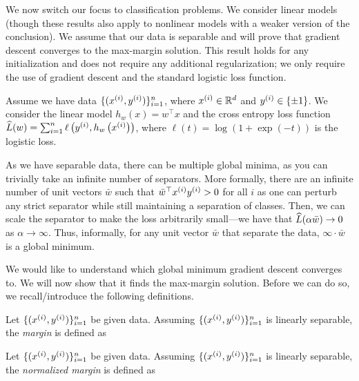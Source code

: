We now switch our focus to classification problems. We consider linear models (though these results also apply to nonlinear models with a weaker version of the conclusion). We assume that our data is separable and will prove that gradient descent converges to the max-margin solution. This result holds for any initialization and does not require any additional regularization; we only require the use of gradient descent and the standard logistic loss function.

Assume we have data $\{(x\sp{i}, y\sp{i}) \}_{i=1}^n $, where $x\sp{i} \in \R^d$ and $y\sp{i} \in \{\pm 1 \}$. We consider the linear model $ h_w(x) = w^\top x$ and the cross entropy loss function $\hatL (w) = \sum_{i=1}^n \ell\left(y\sp{i}, h_w\l (x\sp{i} \r )\right)$, where $ \ell(t) = \log(1 + \exp(-t))$ is the logistic loss.

As we have separable data, there can be multiple global minima, as you can trivially take an infinite number of separators. More formally, there are an infinite number of unit vectors $\bar{w}$ such that $\bar{w}^\top x\sp{i} y\sp{i} > 0$ for all $i$ as one can perturb any strict separator  while still maintaining a separation of classes. Then, we can scale the separator to make the loss arbitrarily small---we have that $ \hatL(\alpha \bar{w}) \to 0$ as $ \alpha \to \infty$. Thus, informally, for any unit vector $\bar{w}$ that separate the data, $\infty \cdot \bar{w}$ is a global minimum. %

We would like to understand which global minimum gradient descent converges to. We will now show that it finds the max-margin solution. Before we can do so, we recall/introduce the following definitions.

\begin{definition}[Margin]
Let $\{(x\sp{i}, y\sp{i}) \}_{i=1}^n $ be given data. Assuming $\{(x\sp{i}, y\sp{i}) \}_{i=1}^n$ is linearly separable, the \textit{margin} is defined as
\end{definition}

\begin{definition}\label{lec16:def:norm_margin}
Let $\{(x\sp{i}, y\sp{i}) \}_{i=1}^n $ be given data. Assuming $\{(x\sp{i}, y\sp{i}) \}_{i=1}^n$ is linearly separable, the \textit{normalized margin} is defined as
\end{definition}


